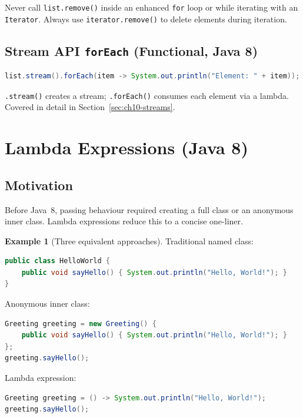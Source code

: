 \documentclass[11pt, a4paper, notitlepage]{report}
\theoremstyle{definition}
\theoremstyle{remark}
\theoremstyle{definition}
\newtheorem{example}[theorem]{Example}
\begin{document}
\begin{warning}[title={Warning: \texttt{ConcurrentModificationException}}]
Never call \texttt{list.remove()} inside an enhanced \texttt{for} loop or while
iterating with an \texttt{Iterator}.  Always use \texttt{iterator.remove()} to
delete elements during iteration.
\end{warning}

\subsection{Stream API \texttt{forEach} (Functional, Java 8)}
\label{subsec:ch10-stream-foreach}
\begin{lstlisting}[language=Java]
list.stream().forEach(item -> System.out.println("Element: " + item));
\end{lstlisting}
\texttt{.stream()} creates a stream; \texttt{.forEach()} consumes each element via
a lambda.  Covered in detail in Section~\ref{sec:ch10-streams}.

\section{Lambda Expressions (Java 8)}
\label{sec:ch10-lambdas}

\subsection{Motivation}
\label{subsec:ch10-lambda-motivation}

Before Java~8, passing behaviour required creating a full class or an anonymous inner
class.  Lambda expressions reduce this to a concise one-liner.

\begin{example}[Three equivalent approaches]
Traditional named class:
\begin{lstlisting}[language=Java]
public class HelloWorld {
    public void sayHello() { System.out.println("Hello, World!"); }
}
\end{lstlisting}
Anonymous inner class:
\begin{lstlisting}[language=Java]
Greeting greeting = new Greeting() {
    public void sayHello() { System.out.println("Hello, World!"); }
};
greeting.sayHello();
\end{lstlisting}
Lambda expression:
\begin{lstlisting}[language=Java]
Greeting greeting = () -> System.out.println("Hello, World!");
greeting.sayHello();
\end{lstlisting}
\end{example}
\end{document}
